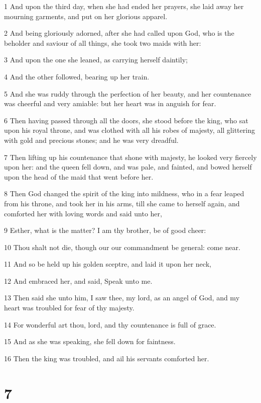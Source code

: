 \par 1 And upon the third day, when she had ended her prayers, she laid away her mourning garments, and put on her glorious apparel.
\par 2 And being gloriously adorned, after she had called upon God, who is the beholder and saviour of all things, she took two maids with her:
\par 3 And upon the one she leaned, as carrying herself daintily;
\par 4 And the other followed, bearing up her train.
\par 5 And she was ruddy through the perfection of her beauty, and her countenance was cheerful and very amiable: but her heart was in anguish for fear.
\par 6 Then having passed through all the doors, she stood before the king, who sat upon his royal throne, and was clothed with all his robes of majesty, all glittering with gold and precious stones; and he was very dreadful.
\par 7 Then lifting up his countenance that shone with majesty, he looked very fiercely upon her: and the queen fell down, and was pale, and fainted, and bowed herself upon the head of the maid that went before her.
\par 8 Then God changed the spirit of the king into mildness, who in a fear leaped from his throne, and took her in his arms, till she came to herself again, and comforted her with loving words and said unto her,
\par 9 Esther, what is the matter? I am thy brother, be of good cheer:
\par 10 Thou shalt not die, though our our commandment be general: come near.
\par 11 And so be held up his golden sceptre, and laid it upon her neck,
\par 12 And embraced her, and said, Speak unto me.
\par 13 Then said she unto him, I saw thee, my lord, as an angel of God, and my heart was troubled for fear of thy majesty.
\par 14 For wonderful art thou, lord, and thy countenance is full of grace.
\par 15 And as she was speaking, she fell down for faintness.
\par 16 Then the king was troubled, and ail his servants comforted her.

\chapter{7}


